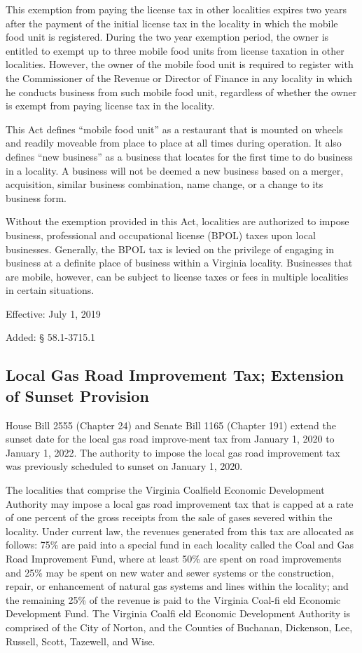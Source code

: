 \documentclass[
]{book}
\begin{document}
This exemption from paying the license tax in other localities expires two years after the payment of the initial license tax in the locality in which the mobile food unit is registered. During the two year exemption period, the owner is entitled to exempt up to three mobile food units from license taxation in other localities. However, the owner of the mobile food unit is required to register with the Commissioner of the Revenue or Director of Finance in any locality in which he conducts business from such mobile food unit, regardless of whether the owner is exempt from paying license tax in the locality.

This Act defines ``mobile food unit'' as a restaurant that is mounted on wheels and readily moveable from place to place at all times during operation. It also defines ``new business'' as a business that locates for the first time to do business in a locality. A business will not be deemed a new business based on a merger, acquisition, similar business combination, name change, or a change to its business form.

Without the exemption provided in this Act, localities are authorized to impose business, professional and occupational license (BPOL) taxes upon local businesses. Generally, the BPOL tax is levied on the privilege of engaging in business at a definite place of business within a Virginia locality. Businesses that are mobile, however, can be subject to license taxes or fees in multiple localities in certain situations.

Effective: July 1, 2019

Added: § 58.1-3715.1

\hypertarget{local-gas-road-improvement-tax-extension-of-sunset-provision}{%
\subsection{Local Gas Road Improvement Tax; Extension of Sunset Provision}\label{local-gas-road-improvement-tax-extension-of-sunset-provision}}

House Bill 2555 (Chapter 24) and Senate Bill 1165 (Chapter 191) extend the sunset date for the local gas road improve-ment tax from January 1, 2020 to January 1, 2022. The authority to impose the local gas road improvement tax was previously scheduled to sunset on January 1, 2020.

The localities that comprise the Virginia Coalfield Economic Development Authority may impose a local gas road improvement tax that is capped at a rate of one percent of the gross receipts from the sale of gases severed within the locality. Under current law, the revenues generated from this tax are allocated as follows: 75\% are paid into a special fund in each locality called the Coal and Gas Road Improvement Fund, where at least 50\% are spent on road improvements and 25\% may be spent on new water and sewer systems or the construction, repair, or enhancement of natural gas systems and lines within the locality; and the remaining 25\% of the revenue is paid to the Virginia Coal-fi eld Economic Development Fund. The Virginia Coalfi eld Economic Development Authority is comprised of the City of Norton, and the Counties of Buchanan, Dickenson, Lee, Russell, Scott, Tazewell, and Wise.
\end{document}

